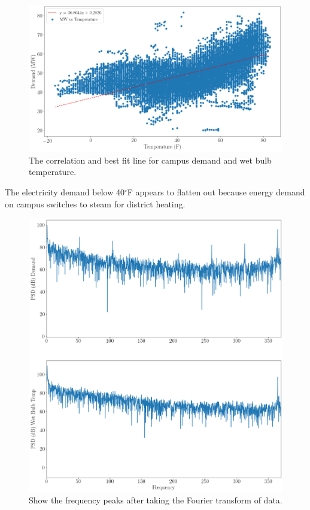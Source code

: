 	\begin{figure}[H]
	  \centering
	  \includegraphics[width=\textwidth]{./figures/demandtempcorr.png}
	  \caption{The correlation and best fit line for campus demand and wet bulb
	  temperature.}
	  \label{fig:tempcorrelation}
	\end{figure}

	The electricity demand below 40$^\circ$F appears to flatten out because energy
	demand on campus switches to steam for district heating. 

	\begin{figure}[H]
	  \centering
	  \includegraphics[width=\textwidth]{./figures/demandtempfreq.png}
	  \caption{Show the frequency peaks after taking the Fourier transform of data.}
	  \label{fig:demandfreq}
	\end{figure}

